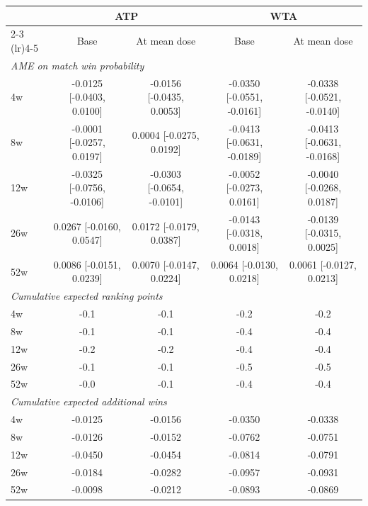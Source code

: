 \begin{tabular}{l cccc}
\toprule
 & \multicolumn{2}{c}{ATP} & \multicolumn{2}{c}{WTA} \\
\cmidrule(lr){2-3} \cmidrule(lr){4-5}
 & Base & At mean dose & Base & At mean dose \\
\midrule
\multicolumn{5}{l}{\textit{AME on match win probability}} \\
4w & -0.0125 [-0.0403, 0.0100] & -0.0156 [-0.0435, 0.0053] & -0.0350 [-0.0551, -0.0161] & -0.0338 [-0.0521, -0.0140] \\
8w & -0.0001 [-0.0257, 0.0197] & 0.0004 [-0.0275, 0.0192] & -0.0413 [-0.0631, -0.0189] & -0.0413 [-0.0631, -0.0168] \\
12w & -0.0325 [-0.0756, -0.0106] & -0.0303 [-0.0654, -0.0101] & -0.0052 [-0.0273, 0.0161] & -0.0040 [-0.0268, 0.0187] \\
26w & 0.0267 [-0.0160, 0.0547] & 0.0172 [-0.0179, 0.0387] & -0.0143 [-0.0318, 0.0018] & -0.0139 [-0.0315, 0.0025] \\
52w & 0.0086 [-0.0151, 0.0239] & 0.0070 [-0.0147, 0.0224] & 0.0064 [-0.0130, 0.0218] & 0.0061 [-0.0127, 0.0213] \\
\midrule
\multicolumn{5}{l}{\textit{Cumulative expected ranking points}} \\
4w & -0.1 & -0.1 & -0.2 & -0.2 \\
8w & -0.1 & -0.1 & -0.4 & -0.4 \\
12w & -0.2 & -0.2 & -0.4 & -0.4 \\
26w & -0.1 & -0.1 & -0.5 & -0.5 \\
52w & -0.0 & -0.1 & -0.4 & -0.4 \\
\midrule
\multicolumn{5}{l}{\textit{Cumulative expected additional wins}} \\
4w & -0.0125 & -0.0156 & -0.0350 & -0.0338 \\
8w & -0.0126 & -0.0152 & -0.0762 & -0.0751 \\
12w & -0.0450 & -0.0454 & -0.0814 & -0.0791 \\
26w & -0.0184 & -0.0282 & -0.0957 & -0.0931 \\
52w & -0.0098 & -0.0212 & -0.0893 & -0.0869 \\
\bottomrule
\end{tabular}
